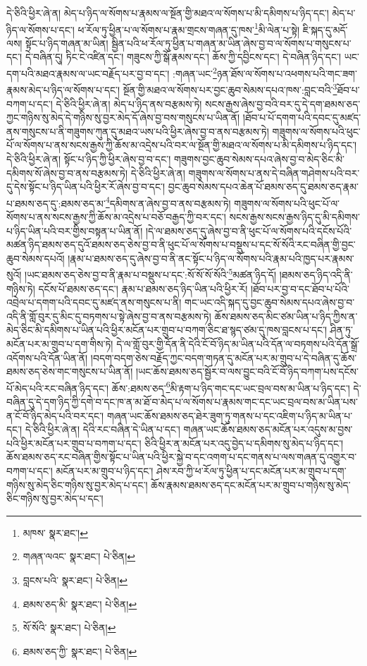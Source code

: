 དེ་ཅིའི་ཕྱིར་ཞེ་ན། མེད་པ་ཉིད་ལ་སོགས་པ་རྣམས་ལ་སྔོན་གྱི་མཐའ་ལ་སོགས་པ་མི་དམིགས་པ་ཉིད་དང་། མེད་པ་ཉིད་ལ་སོགས་པ་དང་། ཕ་རོལ་ཏུ་ཕྱིན་པ་ལ་སོགས་པ་རྣམ་གྲངས་གཞན་དུ་ཁས་\footnote{མཁས་  སྣར་ཐང་། }མི་ལེན་པ་སྟེ། ཇི་སྐད་དུ་མདོ་ལས། སྟོང་པ་ཉིད་གཞན་མ་ཡིན། སྦྱིན་པའི་ཕ་རོལ་ཏུ་ཕྱིན་པ་གཞན་མ་ཡིན་ཞེས་བྱ་བ་ལ་སོགས་པ་གསུངས་པ་དང་། དེ་བཞིན་དུ། ཏིང་ངེ་འཛིན་དང་། གཟུངས་ཀྱི་སྒོ་རྣམས་དང་། ཆོས་ཀྱི་དབྱིངས་དང་། དེ་བཞིན་ཉིད་དང་། ཡང་དག་པའི་མཐའ་རྣམས་ལ་ཡང་བརྗོད་པར་བྱ་བ་དང་། :གཞན་ཡང་\footnote{གཞན་ལའང་  སྣར་ཐང་།  པེ་ཅིན། }ཉན་ཐོས་ལ་སོགས་པ་འཕགས་པའི་གང་ཟག་རྣམས་མེད་པ་ཉིད་ལ་སོགས་པ་དང་། སྔོན་གྱི་མཐའ་ལ་སོགས་པར་བྱང་ཆུབ་སེམས་དཔའ་ཁས་:བླང་བའི་\footnote{བླངས་པའི་  སྣར་ཐང་།  པེ་ཅིན། }ཐོབ་པ་བཀག་པ་དང་། དེ་ཅིའི་ཕྱིར་ཞེ་ན། མེད་པ་ཉིད་ནས་བརྩམས་ཏེ། སངས་རྒྱས་ཞེས་བྱ་བའི་བར་དུ་དེ་དག་ཐམས་ཅད་ཀྱང་གཉིས་སུ་མེད་དེ་གཉིས་སུ་བྱར་མེད་དོ་ཞེས་བྱ་བས་གསུངས་པ་ཡིན་ནོ། །ཐོབ་པ་པོ་དགག་པའི་དབང་དུ་མཛད་ནས་གསུངས་པ་ནི་གཟུགས་ཀུན་དུ་མཐའ་ཡས་པའི་ཕྱིར་ཞེས་བྱ་བ་ནས་བརྩམས་ཏེ། གཟུགས་ལ་སོགས་པའི་ཕུང་པོ་ལ་སོགས་པ་ནས་སངས་རྒྱས་ཀྱི་ཆོས་མ་འདྲེས་པའི་བར་ལ་སྔོན་གྱི་མཐའ་ལ་སོགས་པ་མི་དམིགས་པ་ཉིད་དང་། དེ་ཅིའི་ཕྱིར་ཞེ་ན། སྟོང་པ་ཉིད་ཀྱི་ཕྱིར་ཞེས་བྱ་བ་དང་། གཟུགས་བྱང་ཆུབ་སེམས་དཔའ་ཞེས་བྱ་བ་མེད་ཅིང་མི་དམིགས་སོ་ཞེས་བྱ་བ་ནས་བརྩམས་ཏེ། དེ་ཅིའི་ཕྱིར་ཞེ་ན། གཟུགས་ལ་སོགས་པ་ནས་དེ་བཞིན་གཤེགས་པའི་བར་དུ་དེས་སྟོང་པ་ཉིད་ཡིན་པའི་ཕྱིར་རོ་ཞེས་བྱ་བ་དང་། བྱང་ཆུབ་སེམས་དཔའ་ཆེན་པོ་ཐམས་ཅད་དུ་ཐམས་ཅད་རྣམ་པ་ཐམས་ཅད་དུ་:ཐམས་ཅད་མ་\footnote{ཐམས་ཅད་མི་  སྣར་ཐང་།  པེ་ཅིན། }དམིགས་ན་ཞེས་བྱ་བ་ནས་བརྩམས་ཏེ། གཟུགས་ལ་སོགས་པའི་ཕུང་པོ་ལ་སོགས་པ་ནས་སངས་རྒྱས་ཀྱི་ཆོས་མ་འདྲེས་པ་བཅོ་བརྒྱད་ཀྱི་བར་དང་། སངས་རྒྱས་སངས་རྒྱས་ཉིད་དུ་མི་དམིགས་པ་ཉིད་ཡིན་པའི་བར་གྱིས་བསྟན་པ་ཡིན་ནོ། །དེ་ལ་ཐམས་ཅད་དུ་ཞེས་བྱ་བ་ནི་ཕུང་པོ་ལ་སོགས་པའི་དངོས་པོའི་མཚན་ཉིད་ཐམས་ཅད་དུའོ་ཐམས་ཅད་ཅེས་བྱ་བ་ནི་ཕུང་པོ་ལ་སོགས་པ་བསྡུས་པ་དང་སོ་སོའི་རང་བཞིན་གྱི་བྱང་ཆུབ་སེམས་དཔའོ། །རྣམ་པ་ཐམས་ཅད་དུ་ཞེས་བྱ་བ་ནི་ནང་སྟོང་པ་ཉིད་ལ་སོགས་པའི་རྣམ་པའི་ཁྱད་པར་རྣམས་སུའོ། །ཡང་ཐམས་ཅད་ཅེས་བྱ་བ་ནི་རྣམ་པ་བསྡུས་པ་དང་:སོ་སོ་སོ་སོའི་\footnote{སོ་སོའི་  སྣར་ཐང་།  པེ་ཅིན། }མཚན་ཉིད་དོ། །ཐམས་ཅད་ཉིད་འདི་ནི་གཉིས་ཏེ། དངོས་པོ་ཐམས་ཅད་དང་། རྣམ་པ་ཐམས་ཅད་ཉིད་ཡིན་པའི་ཕྱིར་རོ། །ཐོབ་པར་བྱ་བ་དང་ཐོབ་པ་པོའི་འབྲེལ་པ་དགག་པའི་དབང་དུ་མཛད་ནས་གསུངས་པ་ནི། གང་ཡང་འདི་སྐད་དུ་བྱང་ཆུབ་སེམས་དཔའ་ཞེས་བྱ་བ་འདི་ནི་གློ་བུར་དུ་མིང་དུ་བཏགས་པ་སྟེ་ཞེས་བྱ་བ་ནས་བརྩམས་ཏེ། ཆོས་ཐམས་ཅད་མིང་ཙམ་ཡིན་པ་ཉིད་ཀྱིས་ན་མེད་ཅིང་མི་དམིགས་པ་ཡིན་པའི་ཕྱིར་མངོན་པར་གྲུབ་པ་བཀག་ཅིང་ཐ་སྙད་ཙམ་དུ་ཁས་བླངས་པ་དང་། ཤིན་ཏུ་མངོན་པར་མ་གྲུབ་པ་དག་གིས་ཏེ། དེ་ལ་གློ་བུར་གྱི་དོན་ནི་དེའི་ངོ་བོ་ཉིད་མ་ཡིན་པའི་དོན་ལ་བཏགས་པའི་དོན་སྒྲོ་འདོགས་པའི་དོན་ཡིན་ནོ། །བདག་བདག་ཅེས་བརྗོད་ཀྱང་བདག་གཏན་དུ་མངོན་པར་མ་གྲུབ་པ་དེ་བཞིན་དུ་ཆོས་ཐམས་ཅད་ཅེས་གང་གསུངས་པ་ཡིན་ནོ། །ཡང་ཆོས་ཐམས་ཅད་སྦྱོར་བ་ལས་བྱུང་བའི་ངོ་བོ་ཉིད་བཀག་པས་དངོས་པོ་མེད་པའི་རང་བཞིན་ཉིད་དང་། ཆོས་:ཐམས་ཅད་\footnote{ཐམས་ཅད་ཀྱི་  སྣར་ཐང་།  པེ་ཅིན། }མི་རྟག་པ་ཉིད་གང་དང་ཡང་བྲལ་བས་མ་ཡིན་པ་ཉིད་དང་། དེ་བཞིན་དུ་དེ་དག་ཉིད་ཀྱི་དགེ་བ་དང་ཁ་ན་མ་ཐོ་བ་མེད་པ་ལ་སོགས་པ་རྣམས་གང་དང་ཡང་བྲལ་བས་མ་ཡིན་པས་ན་ངོ་བོ་ཉིད་མེད་པའི་བར་དང་། གཞན་ཡང་ཆོས་ཐམས་ཅད་ཐེར་ཟུག་ཏུ་གནས་པ་དང་འཇིག་པ་ཉིད་མ་ཡིན་པ་དང་། དེ་ཅིའི་ཕྱིར་ཞེ་ན། དེའི་རང་བཞིན་དེ་ཡིན་པ་དང་། གཞན་ཡང་ཆོས་ཐམས་ཅད་མངོན་པར་འདུས་མ་བྱས་པའི་ཕྱིར་མངོན་པར་གྲུབ་པ་བཀག་པ་དང་། ཅིའི་ཕྱིར་ན་མངོན་པར་འདུ་བྱེད་པ་དམིགས་སུ་མེད་པ་ཉིད་དང་། ཆོས་ཐམས་ཅད་རང་བཞིན་གྱིས་སྟོང་པ་ཡིན་པའི་ཕྱིར་སྐྱེ་བ་དང་འགག་པ་དང་གནས་པ་ལས་གཞན་དུ་འགྱུར་བ་བཀག་པ་དང་། མངོན་པར་མ་གྲུབ་པ་ཉིད་དང་། ཤེས་རབ་ཀྱི་ཕ་རོལ་ཏུ་ཕྱིན་པ་དང་མངོན་པར་མ་གྲུབ་པ་དག་གཉིས་སུ་མེད་ཅིང་གཉིས་སུ་བྱར་མེད་པ་དང་། ཆོས་རྣམས་ཐམས་ཅད་དང་མངོན་པར་མ་གྲུབ་པ་གཉིས་སུ་མེད་ཅིང་གཉིས་སུ་བྱར་མེད་པ་དང་། 